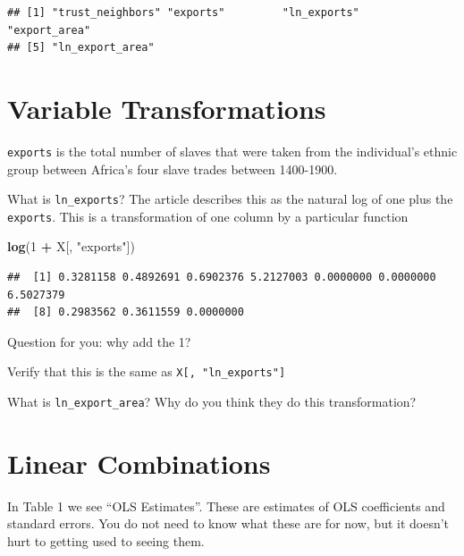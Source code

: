 \documentclass[]{book}
\newenvironment{Shaded}{\begin{snugshade}}{\end{snugshade}}
\newcommand{\KeywordTok}[1]{\textcolor[rgb]{0.13,0.29,0.53}{\textbf{#1}}}
\newcommand{\DecValTok}[1]{\textcolor[rgb]{0.00,0.00,0.81}{#1}}
\newcommand{\StringTok}[1]{\textcolor[rgb]{0.31,0.60,0.02}{#1}}
\newcommand{\OperatorTok}[1]{\textcolor[rgb]{0.81,0.36,0.00}{\textbf{#1}}}
\newcommand{\NormalTok}[1]{#1}
\theoremstyle{definition}
\theoremstyle{definition}
\theoremstyle{definition}
\theoremstyle{remark}
\begin{document}
\begin{verbatim}
## [1] "trust_neighbors" "exports"         "ln_exports"      "export_area"    
## [5] "ln_export_area"
\end{verbatim}

\section{Variable Transformations}\label{variable-transformations}

\texttt{exports} is the total number of slaves that were taken from the
individual's ethnic group between Africa's four slave trades between
1400-1900.

What is \texttt{ln\_exports}? The article describes this as the natural
log of one plus the \texttt{exports}. This is a transformation of one
column by a particular function

\begin{Shaded}
\begin{Highlighting}[]
\KeywordTok{log}\NormalTok{(}\DecValTok{1} \OperatorTok{+}\StringTok{ }\NormalTok{X[, }\StringTok{"exports"}\NormalTok{])}
\end{Highlighting}
\end{Shaded}

\begin{verbatim}
##  [1] 0.3281158 0.4892691 0.6902376 5.2127003 0.0000000 0.0000000 6.5027379
##  [8] 0.2983562 0.3611559 0.0000000
\end{verbatim}

Question for you: why add the 1?

Verify that this is the same as \texttt{X{[},\ "ln\_exports"{]}}

What is \texttt{ln\_export\_area}? Why do you think they do this
transformation?

\section{Linear Combinations}\label{linear-combinations}

In Table 1 we see ``OLS Estimates''. These are estimates of OLS
coefficients and standard errors. You do not need to know what these are
for now, but it doesn't hurt to getting used to seeing them.
\end{document}

